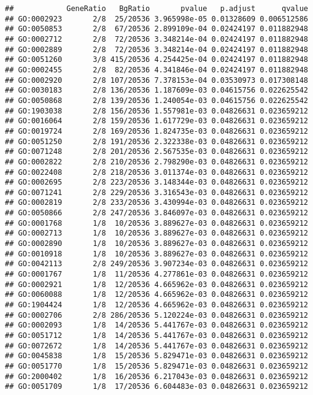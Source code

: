 \documentclass[
]{article}
\begin{document}
\begin{verbatim}
##            GeneRatio   BgRatio       pvalue   p.adjust      qvalue
## GO:0002923       2/8  25/20536 3.965998e-05 0.01328609 0.006512586
## GO:0050853       2/8  67/20536 2.899109e-04 0.02424197 0.011882948
## GO:0002712       2/8  72/20536 3.348214e-04 0.02424197 0.011882948
## GO:0002889       2/8  72/20536 3.348214e-04 0.02424197 0.011882948
## GO:0051260       3/8 415/20536 4.254425e-04 0.02424197 0.011882948
## GO:0002455       2/8  82/20536 4.341846e-04 0.02424197 0.011882948
## GO:0002920       2/8 107/20536 7.378153e-04 0.03530973 0.017308148
## GO:0030183       2/8 136/20536 1.187609e-03 0.04615756 0.022625542
## GO:0050868       2/8 139/20536 1.240054e-03 0.04615756 0.022625542
## GO:1903038       2/8 156/20536 1.557981e-03 0.04826631 0.023659212
## GO:0016064       2/8 159/20536 1.617729e-03 0.04826631 0.023659212
## GO:0019724       2/8 169/20536 1.824735e-03 0.04826631 0.023659212
## GO:0051250       2/8 191/20536 2.322338e-03 0.04826631 0.023659212
## GO:0071248       2/8 201/20536 2.567535e-03 0.04826631 0.023659212
## GO:0002822       2/8 210/20536 2.798290e-03 0.04826631 0.023659212
## GO:0022408       2/8 218/20536 3.011374e-03 0.04826631 0.023659212
## GO:0002695       2/8 223/20536 3.148344e-03 0.04826631 0.023659212
## GO:0071241       2/8 229/20536 3.316543e-03 0.04826631 0.023659212
## GO:0002819       2/8 233/20536 3.430994e-03 0.04826631 0.023659212
## GO:0050866       2/8 247/20536 3.846097e-03 0.04826631 0.023659212
## GO:0001768       1/8  10/20536 3.889627e-03 0.04826631 0.023659212
## GO:0002713       1/8  10/20536 3.889627e-03 0.04826631 0.023659212
## GO:0002890       1/8  10/20536 3.889627e-03 0.04826631 0.023659212
## GO:0010918       1/8  10/20536 3.889627e-03 0.04826631 0.023659212
## GO:0042113       2/8 249/20536 3.907234e-03 0.04826631 0.023659212
## GO:0001767       1/8  11/20536 4.277861e-03 0.04826631 0.023659212
## GO:0002921       1/8  12/20536 4.665962e-03 0.04826631 0.023659212
## GO:0060088       1/8  12/20536 4.665962e-03 0.04826631 0.023659212
## GO:1904424       1/8  12/20536 4.665962e-03 0.04826631 0.023659212
## GO:0002706       2/8 286/20536 5.120224e-03 0.04826631 0.023659212
## GO:0002093       1/8  14/20536 5.441767e-03 0.04826631 0.023659212
## GO:0051712       1/8  14/20536 5.441767e-03 0.04826631 0.023659212
## GO:0072672       1/8  14/20536 5.441767e-03 0.04826631 0.023659212
## GO:0045838       1/8  15/20536 5.829471e-03 0.04826631 0.023659212
## GO:0051770       1/8  15/20536 5.829471e-03 0.04826631 0.023659212
## GO:2000402       1/8  16/20536 6.217043e-03 0.04826631 0.023659212
## GO:0051709       1/8  17/20536 6.604483e-03 0.04826631 0.023659212

\end{verbatim}
\end{document}
